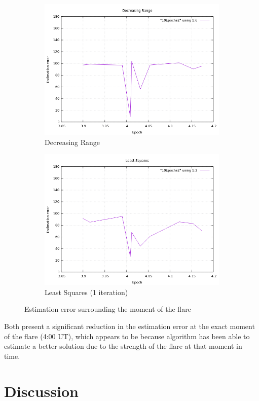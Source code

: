 \begin{figure}[!htb]
	\begin{subfigure}[b]{0.5\textwidth}
		\includegraphics[width=\linewidth]{images/resultsStellar/DR2Epochs.png}
		\caption{Decreasing Range}
	\end{subfigure}
	\hfill
	\begin{subfigure}[b]{0.5\textwidth}
		\includegraphics[width=\linewidth]{images/resultsStellar/LS2Epochs.png}
		\caption{Least Squares (1 iteration)}
	\end{subfigure}
	\caption{Estimation error surrounding the moment of the flare}
	\label{fig:stellar2Epochs10}
\end{figure}

Both present a significant reduction in the estimation error at the exact moment of the flare (4:00 UT), which appears to be because algorithm has been able to estimate a better solution due to the strength of the flare at that moment in time.

\section{Discussion}



